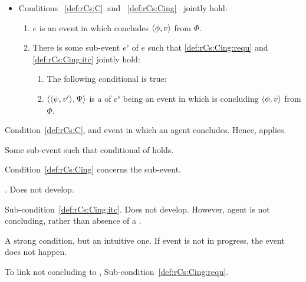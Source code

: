 \begin{note}
\begin{definition}[\rCon{2}]
    \begin{itemize}
    \item
      Conditions~%
      \ref{def:rCs:C}~and~%
      \ref{def:rCs:Cing}~%
      jointly hold:
      \begin{enumerate}[label=\arabic*., ref=(\arabic*)]
      \item
        \label{def:rCs:C}
        \(e\) is an event in which \vAgent{} concludes \(\langle \phi, v \rangle\) from \(\Phi\).
      \item
        \label{def:rCs:Cing}
        There is some sub-event \(e^{\flat}\) of \(e\) such that \ref{def:rCs:Cing:requ} and \ref{def:rCs:Cing:itc} jointly hold:
        \begin{enumerate}[label=\alph*., ref=(\arabic{enumi}\alph*)]
        \item
          \label{def:rCs:Cing:itc}
          The following conditional is true:
        \item
          \label{def:rCs:Cing:requ}
          \(\langle \langle \psi, v' \rangle, \Psi \rangle\) is a \requ{} of \(e^{\flat}\) being an event in which \vAgent{} is concluding \(\langle \phi, v \rangle\) from \(\Phi\).
        \end{enumerate}
      \end{enumerate}
    \end{itemize}
    \vspace{-1.5\baselineskip}
  \end{definition}

  Condition~\ref{def:rCs:C}, and event in which an agent concludes.
  Hence, \qWhyV{} applies.

  Some sub-event such that conditional of \qWhyV{} holds.

  Condition~\ref{def:rCs:Cing} concerns the sub-event.

  \ros{}.
  Does not develop.

  Sub-condition~\ref{def:rCs:Cing:itc}.
  Does not develop.
  However, agent is not concluding, rather than absence of a \ros{}.

  A strong condition, but an intuitive one.
  If event is not in progress, the event does not happen.

  To link not concluding to \ros{}, Sub-condition~\ref{def:rCs:Cing:requ}.
\end{note}


